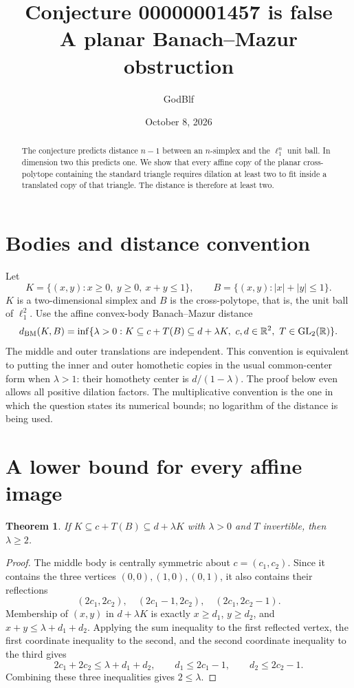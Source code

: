 \documentclass[11pt]{article}
\title{Conjecture 00000001457 is false\\A planar Banach--Mazur obstruction}
\author{GodBlf}
\date{October 8, 2026}
\newtheorem{theorem}{Theorem}
\begin{document}
\maketitle
\begin{abstract}
The conjecture predicts distance $n-1$ between an $n$-simplex and the
$\ell_1^n$ unit ball. In dimension two this predicts one. We show that
every affine copy of the planar cross-polytope containing the standard
triangle requires dilation at least two to fit inside a translated copy
of that triangle. The distance is therefore at least two.
\end{abstract}
\section{Bodies and distance convention}
Let
\[
 K=\{(x,y):x\geq0,\ y\geq0,\ x+y\leq1\},\qquad
 B=\{(x,y):|x|+|y|\leq1\}.
\]
$K$ is a two-dimensional simplex and $B$ is the cross-polytope, that is,
the unit ball of $\ell_1^2$. Use the affine convex-body Banach--Mazur
distance
\[
 d_{\rm BM}(K,B)=\inf\{\lambda>0:
 K\subseteq c+T(B)\subseteq d+\lambda K,
 \ c,d\in\mathbb R^2,\ T\in\mathrm{GL}_2(\mathbb R)\}.
\]
The middle and outer translations are independent. This convention is
equivalent to putting the inner and outer homothetic copies in the usual
common-center form when $\lambda>1$: their homothety center is
$d/(1-\lambda)$. The proof below even allows all positive dilation factors.
The multiplicative convention is the one in which the question states its
numerical bounds; no logarithm of the distance is being used.

\section{A lower bound for every affine image}
\begin{theorem}
If $K\subseteq c+T(B)\subseteq d+\lambda K$ with $\lambda>0$ and $T$
invertible, then $\lambda\geq2$.
\end{theorem}
\begin{proof}
The middle body is centrally symmetric about $c=(c_1,c_2)$.
Since it contains the three vertices $(0,0),(1,0),(0,1)$, it also contains
their reflections
\[
 (2c_1,2c_2),\quad (2c_1-1,2c_2),\quad (2c_1,2c_2-1).
\]
Membership of $(x,y)$ in $d+\lambda K$ is exactly
$x\geq d_1$, $y\geq d_2$, and $x+y\leq\lambda+d_1+d_2$.
Applying the sum inequality to the first reflected vertex, the first
coordinate inequality to the second, and the second coordinate inequality
to the third gives
\[
 2c_1+2c_2\leq\lambda+d_1+d_2,
 \qquad d_1\leq2c_1-1,\qquad d_2\leq2c_2-1.
\]
Combining these three inequalities gives $2\leq\lambda$.
\end{proof}
\end{document}
